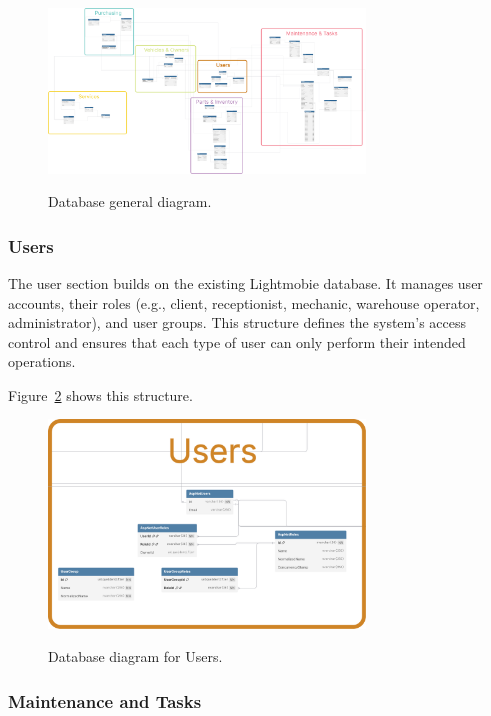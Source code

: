 \begin{figure}[h]
  \caption{Database general diagram.}
  \centering
  \includegraphics[width=0.75\textwidth]{figs/dbDiagrams/DbDiagramFull}
  \label{fig:dbGeneral} 
\end{figure}



\subsubsection{Users} 

The user section builds on the existing Lightmobie database. It manages user accounts, their roles (e.g., client, receptionist, mechanic, warehouse operator, administrator), and user groups. This structure defines the system’s access control and ensures that each type of user can only perform their intended operations.

Figure~\ref{fig:dbUsers} shows this structure.

\begin{figure}[h]
  \caption{Database diagram for Users.}
  \centering
  \includegraphics[width=0.75\textwidth]{figs/dbDiagrams/Users}
  \label{fig:dbUsers}
\end{figure}


\subsubsection{Maintenance and Tasks} 


